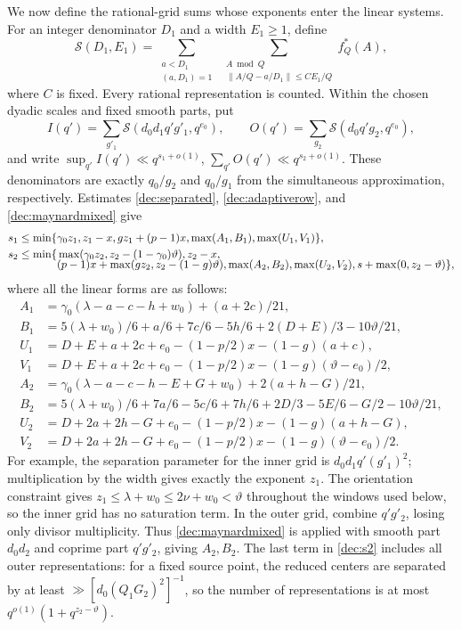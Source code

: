 \documentclass[11pt,a4paper]{article}
\theoremstyle{paperplain}
\numberwithin{equation}{section}
\begin{document}
We now define the rational-grid sums whose exponents enter the linear systems.
For an integer denominator $D_1$ and a width $E_1\ge1$, define
\[
 \mathcal S(D_1,E_1)=
 \sum_{\substack{a<D_1\\(a,D_1)=1}}
 \ \sum_{\substack{A\bmod Q\\\|A/Q-a/D_1\|\le C E_1/Q}}
 f_Q^*(A),
\]
where $C$ is fixed. Every rational representation is counted.
Within the chosen dyadic scales and fixed smooth parts, put
\[
 I(q')=\sum_{g'_1}\mathcal S(d_0d_1q'g'_1,q^{e_0}),\qquad
 O(q')=\sum_{g_2}\mathcal S(d_0q'g_2,q^{e_0}),
\]
and write $\sup_{q'}I(q')\ll q^{s_1+o(1)}$,
$\sum_{q'}O(q')\ll q^{s_2+o(1)}$.
These denominators are exactly $q_0/g_2$ and $q_0/g_1$ from the
simultaneous approximation, respectively.
Estimates \eqref{dec:separated}, \eqref{dec:adaptiverow}, and
\eqref{dec:maynardmixed} give
\begin{align}
 s_1\le\min\{&\gamma_0z_1,z_1-x,gz_1+(p-1)x,
                \max(A_1,B_1),\max(U_1,V_1)\},\label{dec:s1}\\
 s_2\le\min\{&\max(\gamma_0z_2,z_2-(1-\gamma_0)\vartheta),z_2-x,
 \notag\\[-2mm]
 & (p-1)x+\max(gz_2,z_2-(1-g)\vartheta),
   \max(A_2,B_2),\max(U_2,V_2),s+\max(0,z_2-\vartheta)\},
 \label{dec:s2}
\end{align}
where all the linear forms are as follows:
\begin{align*}
 A_1&=\gamma_0(\lambda-a-c-h+w_0)+(a+2c)/21,\\
 B_1&=5(\lambda+w_0)/6+a/6+7c/6-5h/6+2(D+E)/3-10\vartheta/21,\\
 U_1&=D+E+a+2c+e_0-(1-p/2)x-(1-g)(a+c),\\
 V_1&=D+E+a+2c+e_0-(1-p/2)x-(1-g)(\vartheta-e_0)/2,\\
 A_2&=\gamma_0(\lambda-a-c-h-E+G+w_0)+2(a+h-G)/21,\\
 B_2&=5(\lambda+w_0)/6+7a/6-5c/6+7h/6+2D/3-5E/6-G/2-10\vartheta/21,\\
 U_2&=D+2a+2h-G+e_0-(1-p/2)x-(1-g)(a+h-G),\\
 V_2&=D+2a+2h-G+e_0-(1-p/2)x-(1-g)(\vartheta-e_0)/2.
\end{align*}
For example, the separation parameter for the inner grid is
$d_0d_1q'(g'_1)^2$; multiplication by the width gives exactly the
exponent $z_1$. The orientation constraint gives
$z_1\le\lambda+w_0\le2\nu+w_0<\vartheta$ throughout the windows
used below, so the inner grid has no saturation term. In the outer grid, combine $q'g'_2$, losing only divisor
multiplicity. Thus \eqref{dec:maynardmixed} is applied with smooth part
$d_0d_2$ and coprime part $q'g'_2$, giving $A_2,B_2$.
The last term in \eqref{dec:s2} includes all outer representations:
for a fixed source point, the reduced centers are separated by at least
$\gg[d_0(Q_1G_2)^2]^{-1}$, so the number of representations is at most
$q^{o(1)}(1+q^{z_2-\vartheta})$.
\end{document}
